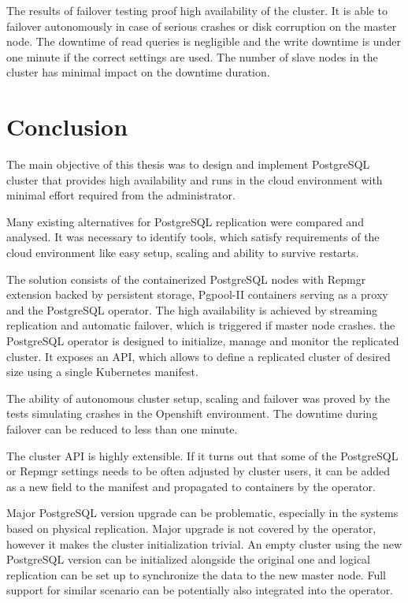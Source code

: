 \documentclass[
  digital, %
  twoside, %
  table,   %
  lof,     %
  lot,     %
]{fithesis3}
\begin{document}
The results of failover testing proof high availability of the cluster. It is able to failover autonomously in case of serious crashes or disk corruption on the master node. The downtime of read queries is negligible and the write downtime is under one minute if the correct settings are used. The number of slave nodes in the cluster has minimal impact on the downtime duration.

\chapter{Conclusion} \label{chap:conclusion}
The main objective of this thesis was to design and implement PostgreSQL cluster that provides high availability and runs in the cloud environment with minimal effort required from the administrator.

Many existing alternatives for PostgreSQL replication were compared and analysed. It was necessary to identify tools, which satisfy requirements of the cloud environment like easy setup, scaling and ability to survive restarts.

The solution consists of the containerized PostgreSQL nodes with Repmgr extension backed by persistent storage, Pgpool-II containers serving as a proxy and the PostgreSQL operator. The high availability is achieved by streaming replication and automatic failover, which is triggered if master node crashes. the PostgreSQL operator is designed to initialize, manage and monitor the replicated cluster. It exposes an API, which allows to define a replicated cluster of desired size using a single Kubernetes manifest.

The ability of autonomous cluster setup, scaling and failover was proved by the tests simulating crashes in the Openshift environment. The downtime during failover can be reduced to less than one minute.

The cluster API is highly extensible. If it turns out that some of the PostgreSQL or Repmgr settings needs to be often adjusted by cluster users, it can be added as a new field to the manifest and propagated to containers by the operator.

Major PostgreSQL version upgrade can be problematic, especially in the systems based on physical replication. Major upgrade is not covered by the operator, however it makes the cluster initialization trivial. An empty cluster using the new PostgreSQL version can be initialized alongside the original one and logical replication can be set up to synchronize the data to the new master node. Full support for similar scenario can be potentially also integrated into the operator.
\end{document}
